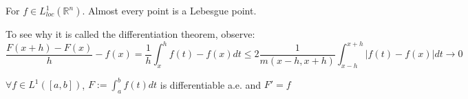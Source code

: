 \begin{theorem}
	For $f \in L_{loc}^1(\mathbb{R}^n)$. Almost every point is a Lebesgue point.
\end{theorem}
\begin{remark}
To see why it is called the differentiation theorem, observe:
\begin{equation*}
	\frac{F(x + h) - F(x)}{h} - f(x) = \frac{1}{h}\int_x^h f(t) - f(x) dt \leq 2 \frac{1}{m(x-h, x + h)} \int^{x+h}_{x-h} |f(t) - f(x)| dt \rightarrow 0 
\end{equation*}	
\end{remark}


\begin{corollary}
	$\forall f \in L^1([a, b])$, $F := \int_a^b f(t) dt$ is differentiable a.e. and $F' = f$ 
\end{corollary}

\begin{theorem}
\end{theorem}

